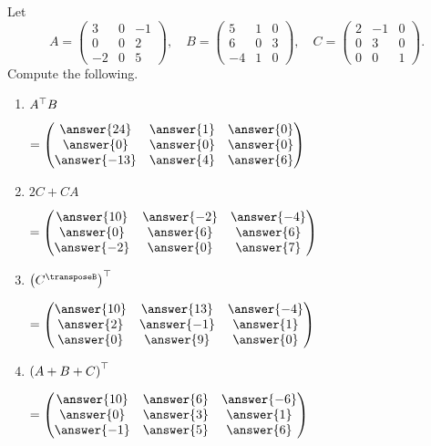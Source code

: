 \documentclass{ximera}
\author{Parisa Fatheddin}
\begin{document}
\begin{exercise}
  Let
  \[
    A =
    \begin{pmatrix}
      3 & 0 & -1\\
      0 & 0 & 2\\
      -2 & 0 & 5
    \end{pmatrix},\quad
    B =
    \begin{pmatrix}
      5 & 1 & 0\\
      6 & 0 & 3\\
      -4 & 1 & 0
    \end{pmatrix},\quad
    C =
    \begin{pmatrix}
      2 & -1 & 0\\
      0 & 3 & 0 \\
      0 & 0 & 1
    \end{pmatrix}.
  \]
  Compute the following.
  \begin{enumerate}
  \item $A^\top B$
    \begin{prompt} $=
      \begin{pmatrix}
        \answer{24} & \answer{1} & \answer{0}\\
        \answer{0} & \answer{0} & \answer{0}\\
        \answer{-13} & \answer{4} & \answer{6}
      \end{pmatrix}$
    \end{prompt}

  \item $2C + CA$
    \begin{prompt} $=
      \begin{pmatrix}
        \answer{10} & \answer{-2} & \answer{-4}\\
        \answer{0} & \answer{6} & \answer{6}\\
        \answer{-2} & \answer{0} & \answer{7}
      \end{pmatrix}$
    \end{prompt}

  \item $\left( C^\transposeB  \right)^\transpose$
    \begin{prompt} $=
      \begin{pmatrix}
        \answer{10} & \answer{13} & \answer{-4}\\
        \answer{2} & \answer{-1} & \answer{1}\\
        \answer{0} & \answer{9} & \answer{0}
      \end{pmatrix}$
    \end{prompt}

  \item $\left(A + B + C\right)^\top $
    \begin{prompt} $=
      \begin{pmatrix}
        \answer{10} & \answer{6} & \answer{-6}\\
        \answer{0} & \answer{3} & \answer{1}\\
        \answer{-1} & \answer{5} & \answer{6}
      \end{pmatrix}$
    \end{prompt}
  \end{enumerate}
\end{exercise}
\end{document}
